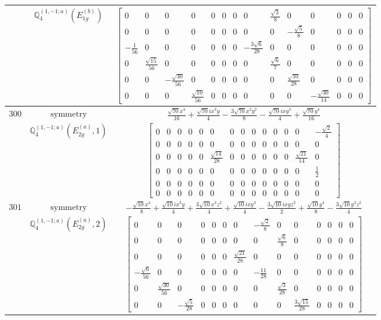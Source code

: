 \documentclass[fleqn,8pt,landscape]{jsarticle}
\begin{document}
\begin{longtable}{ccc}
$  $ & $ \mathbb{Q}_{4}^{(1,-1;a)}(E_{1g}^{(b)}) $ & $ \begin{bmatrix} 0 & 0 & 0 & 0 & 0 & 0 & 0 & 0 & \frac{\sqrt{3}}{8} & 0 & 0 & 0 & 0 & 0 \\ 0 & 0 & 0 & 0 & 0 & 0 & 0 & 0 & 0 & - \frac{\sqrt{5}}{8} & 0 & 0 & 0 & 0 \\ - \frac{1}{56} & 0 & 0 & 0 & 0 & 0 & 0 & - \frac{3 \sqrt{6}}{28} & 0 & 0 & 0 & 0 & 0 & 0 \\ 0 & \frac{\sqrt{15}}{56} & 0 & 0 & 0 & 0 & 0 & 0 & \frac{\sqrt{6}}{7} & 0 & 0 & 0 & 0 & 0 \\ 0 & 0 & - \frac{\sqrt{30}}{56} & 0 & 0 & 0 & 0 & 0 & 0 & \frac{\sqrt{10}}{28} & 0 & 0 & 0 & 0 \\ 0 & 0 & 0 & \frac{\sqrt{10}}{56} & 0 & 0 & 0 & 0 & 0 & 0 & - \frac{\sqrt{30}}{14} & 0 & 0 & 0 \end{bmatrix} $ \\ \hline
$ 300 $ & $ \text{symmetry} $ & $ \frac{\sqrt{70} x^{4}}{16} + \frac{\sqrt{70} i x^{3} y}{4} - \frac{3 \sqrt{70} x^{2} y^{2}}{8} - \frac{\sqrt{70} i x y^{3}}{4} + \frac{\sqrt{70} y^{4}}{16} $ \\
$  $ & $ \mathbb{Q}_{4}^{(1,-1;a)}(E_{2g}^{(a)},1) $ & $ \begin{bmatrix} 0 & 0 & 0 & 0 & 0 & 0 & 0 & 0 & 0 & 0 & 0 & 0 & 0 & - \frac{\sqrt{2}}{4} \\ 0 & 0 & 0 & 0 & 0 & 0 & 0 & 0 & 0 & 0 & 0 & 0 & 0 & 0 \\ 0 & 0 & 0 & 0 & 0 & \frac{\sqrt{14}}{28} & 0 & 0 & 0 & 0 & 0 & 0 & \frac{\sqrt{21}}{14} & 0 \\ 0 & 0 & 0 & 0 & 0 & 0 & 0 & 0 & 0 & 0 & 0 & 0 & 0 & \frac{1}{2} \\ 0 & 0 & 0 & 0 & 0 & 0 & 0 & 0 & 0 & 0 & 0 & 0 & 0 & 0 \\ 0 & 0 & 0 & 0 & 0 & 0 & 0 & 0 & 0 & 0 & 0 & 0 & 0 & 0 \end{bmatrix} $ \\ \hline
$ 301 $ & $ \text{symmetry} $ & $ - \frac{\sqrt{10} x^{4}}{8} + \frac{\sqrt{10} i x^{3} y}{4} + \frac{3 \sqrt{10} x^{2} z^{2}}{4} + \frac{\sqrt{10} i x y^{3}}{4} - \frac{3 \sqrt{10} i x y z^{2}}{2} + \frac{\sqrt{10} y^{4}}{8} - \frac{3 \sqrt{10} y^{2} z^{2}}{4} $ \\
$  $ & $ \mathbb{Q}_{4}^{(1,-1;a)}(E_{2g}^{(a)},2) $ & $ \begin{bmatrix} 0 & 0 & 0 & 0 & 0 & 0 & 0 & - \frac{\sqrt{2}}{8} & 0 & 0 & 0 & 0 & 0 & 0 \\ 0 & 0 & 0 & 0 & 0 & 0 & 0 & 0 & \frac{\sqrt{6}}{8} & 0 & 0 & 0 & 0 & 0 \\ 0 & 0 & 0 & 0 & 0 & 0 & \frac{\sqrt{21}}{28} & 0 & 0 & 0 & 0 & 0 & 0 & 0 \\ - \frac{\sqrt{6}}{56} & 0 & 0 & 0 & 0 & 0 & 0 & - \frac{11}{28} & 0 & 0 & 0 & 0 & 0 & 0 \\ 0 & \frac{\sqrt{30}}{56} & 0 & 0 & 0 & 0 & 0 & 0 & \frac{\sqrt{3}}{28} & 0 & 0 & 0 & 0 & 0 \\ 0 & 0 & - \frac{\sqrt{5}}{28} & 0 & 0 & 0 & 0 & 0 & 0 & \frac{3 \sqrt{15}}{28} & 0 & 0 & 0 & 0 \end{bmatrix} $ \\ \hline

\end{longtable}
\end{document}
